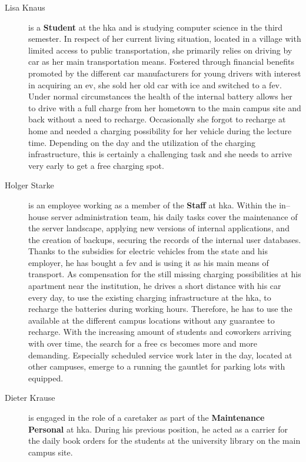 \begin{description}
    \item[Lisa Knaus] is a \textbf{Student} at the \acrshort{hka} and is studying computer science in the third semester. In respect of her current living situation, located in a village with limited access to public transportation, she primarily relies on driving by car as her main transportation means.
    Fostered through financial benefits promoted by the different car manufacturers for young drivers with interest in acquiring an \acrshort{ev}, she sold her old car with \acrshort{ice} and switched to a \acrfull{fev}.
    Under normal circumstances the health of the internal battery allows her to drive with a full charge from her hometown to the main campus site and back without a need to recharge. Occasionally she forgot to recharge at home and needed a charging possibility for her vehicle during the lecture time. Depending on the day and the utilization of the charging infrastructure, this is certainly a challenging task and she needs to arrive very early to get a free charging spot.
    \item[Holger Starke] is an employee working as a member of the \textbf{Staff} at \acrshort{hka}.
    Within the in--house server administration team, his daily tasks cover the maintenance of the server landscape, applying new versions of internal applications, and the creation of backups, securing the records of the internal user databases.
    Thanks to the subsidies for electric vehicles from the state and his employer, he has bought a \acrshort{fev} and is using it as his main means of transport.
    As compensation for the still missing charging possibilities at his apartment near the institution, he drives a short distance with his car every day, to use the existing charging infrastructure at the \acrshort{hka}, to recharge the batteries during working hours.
    Therefore, he has to use the available  at the different campus locations without any guarantee to recharge.
    With the increasing amount of students and coworkers arriving with  over time, the search for a free \acrshort{cs} becomes more and more demanding.
    Especially scheduled service work later in the day, located at other campuses, emerge to a running the gauntlet for parking lots with  equipped.
    \item[Dieter Krause] is engaged in the role of a caretaker as part of the \textbf{Maintenance Personal} at \acrshort{hka}. During his previous position, he acted as a carrier for the daily book orders for the students at the university library on the main campus site.

\end{description}
